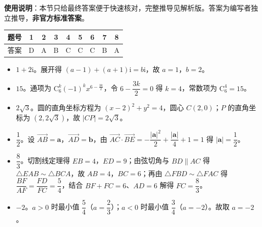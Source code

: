 
\begin{gknotice}
\textbf{使用说明}：本节只给最终答案便于快速核对，完整推导见解析版。答案为编写者独立推导，\textbf{非官方标准答案}。
\end{gknotice}

\begin{center}\begin{tabular}{ccccccccc}
\toprule
题号 & 1 & 2 & 3 & 4 & 5 & 6 & 7 & 8 \\
\midrule
答案 & D & A & B & C & C & C & B & A \\
\bottomrule
\end{tabular}\end{center}

\begin{itemize}[leftmargin=2.6em]
  \item[\textbf{9.}] $1+2\mathrm i$。展开得 $(a-1)+(a+1)\mathrm i=b\mathrm i$，故 $a=1$，$b=2$。
  \item[\textbf{10.}] $15$。通项为 $\mathrm C_6^k(-1)^kx^{6-\frac{3k}{2}}$，令 $6-\dfrac{3k}{2}=0$ 得 $k=4$，常数项为 $\mathrm C_6^4=15$。
  \item[\textbf{11.}] $2\sqrt3$。圆的直角坐标方程为 $(x-2)^2+y^2=4$，圆心 $C(2,0)$；$P$ 的直角坐标为 $(2,2\sqrt3)$，故 $|CP|=2\sqrt3$。
  \item[\textbf{12.}] $\dfrac12$。设 $\overrightarrow{AB}=\boldsymbol a$，$\overrightarrow{AD}=\boldsymbol b$，由 $\overrightarrow{AC}\cdot\overrightarrow{BE}=-\dfrac{|\boldsymbol a|^2}{2}+\dfrac{|\boldsymbol a|}{4}+1=1$ 得 $|\boldsymbol a|=\dfrac12$。
  \item[\textbf{13.}] $\dfrac83$。切割线定理得 $EB=4$，$ED=9$；由弦切角与 $BD\parallel AC$ 得 $\triangle EAB\sim\triangle BCA$，故 $AB=4$，$BC=6$；再由 $\triangle FBD\sim\triangle FAC$ 得 $\dfrac{BF}{AF}=\dfrac{FD}{FC}=\dfrac54$，结合 $BF+FC=6$、$AD=6$ 解得 $FC=\dfrac83$。
  \item[\textbf{14.}] $-2$。$a>0$ 时最小值 $\dfrac54$（$a=\dfrac23$）；$a<0$ 时最小值 $\dfrac34$（$a=-2$）。故取 $a=-2$。
\end{itemize}

